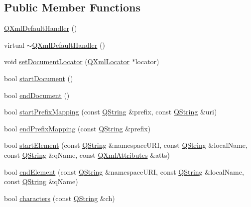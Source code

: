 \subsection*{Public Member Functions}
\begin{DoxyCompactItemize}
\item 
\mbox{\hyperlink{class_q_xml_default_handler_a97addb49dd76cb81b223c45e381f3933}{Q\+Xml\+Default\+Handler}} ()
\item 
virtual \mbox{\hyperlink{class_q_xml_default_handler_a6b048432047efce5fcdd88855e95c3b9}{$\sim$\+Q\+Xml\+Default\+Handler}} ()
\item 
void \mbox{\hyperlink{class_q_xml_default_handler_add9860b32800232e14f6d4150ed23937}{set\+Document\+Locator}} (\mbox{\hyperlink{class_q_xml_locator}{Q\+Xml\+Locator}} $\ast$locator)
\item 
bool \mbox{\hyperlink{class_q_xml_default_handler_a5a1135641cb81d4053ecd4783c7c252b}{start\+Document}} ()
\item 
bool \mbox{\hyperlink{class_q_xml_default_handler_a57ed6d87a89653619ff0d56078c52061}{end\+Document}} ()
\item 
bool \mbox{\hyperlink{class_q_xml_default_handler_a5f8b32143da1251f62c64df4742df77c}{start\+Prefix\+Mapping}} (const \mbox{\hyperlink{class_q_string}{Q\+String}} \&prefix, const \mbox{\hyperlink{class_q_string}{Q\+String}} \&uri)
\item 
bool \mbox{\hyperlink{class_q_xml_default_handler_a8e0cf92238c12e8776711bb4fb0ca4cf}{end\+Prefix\+Mapping}} (const \mbox{\hyperlink{class_q_string}{Q\+String}} \&prefix)
\item 
bool \mbox{\hyperlink{class_q_xml_default_handler_a0381a337b32a16d2ef2a8df9a29cb215}{start\+Element}} (const \mbox{\hyperlink{class_q_string}{Q\+String}} \&namespace\+U\+RI, const \mbox{\hyperlink{class_q_string}{Q\+String}} \&local\+Name, const \mbox{\hyperlink{class_q_string}{Q\+String}} \&q\+Name, const \mbox{\hyperlink{class_q_xml_attributes}{Q\+Xml\+Attributes}} \&atts)
\item 
bool \mbox{\hyperlink{class_q_xml_default_handler_ae5d92a2fbae15a793aedf725b62b16c2}{end\+Element}} (const \mbox{\hyperlink{class_q_string}{Q\+String}} \&namespace\+U\+RI, const \mbox{\hyperlink{class_q_string}{Q\+String}} \&local\+Name, const \mbox{\hyperlink{class_q_string}{Q\+String}} \&q\+Name)
\item 
bool \mbox{\hyperlink{class_q_xml_default_handler_a40c64e4f7fc445abeb753ef11c75f84a}{characters}} (const \mbox{\hyperlink{class_q_string}{Q\+String}} \&ch)
\item 

\end{DoxyCompactItemize}
